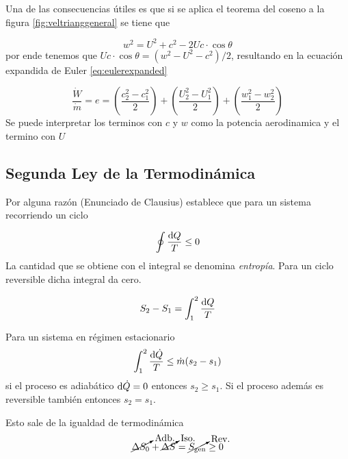 \documentclass{article}
\begin{document}
Una de las consecuencias útiles es que si se aplica el teorema del coseno a la figura \ref{fig:veltrianggeneral} se tiene que

\[
w^2 = U^2 +c^2 -2U c \cdot \cos \theta 
\]
por ende tenemos que $Uc\cdot \cos \theta = (w^2-U^2-c^2)/2$, resultando en la ecuación expandida de Euler \ref{eq:eulerexpanded}

\begin{equation} \label{eq:eulerexpanded}
    \frac{\dot{W}}{\dot{m}}=e= \left(\frac{c_2^2-c_1^2}{2}\right)+\left(\frac{U_2^2-U_1^2}{2}\right)+\left(\frac{w_1^2-w_2^2}{2}\right)
\end{equation}
Se puede interpretar los terminos con $c$ y $w$ como la potencia aerodinamica y el termino con $U$
\subsection{Segunda Ley de la Termodinámica}
Por alguna razón (Enunciado de Clausius) establece que para un sistema recorriendo un ciclo

\[
\oint \frac{\textrm{d} Q}{T} \leq 0
\]
La cantidad que se obtiene con el integral se denomina \textit{entropía}. Para un ciclo reversible dicha integral da cero.

\[
S_2 - S_1 = \int^2_1 \frac{\textrm{d} Q}{T}
\]

Para un sistema en régimen estacionario
\[
\int^2_1 \frac{\textrm{d}\dot{Q}}{T} \leq \dot{m}(s_2 -s_1)
\]
si el proceso es adiabático $\textrm{d} \dot{Q}=0$ entonces $s_2\geq s_1$.  Si el proceso además es reversible también entonces $s_2 =s_1$.

Esto sale de la igualdad de termodinámica
\[
\cancelto{\textrm{Adb.}}{\Delta S_0} + \cancelto{\textrm{Iso.}}{\Delta S} = \cancelto{\textrm{Rev.}}{{S_{\mathrm{gen}}}} \geq 0
\]
\end{document}

